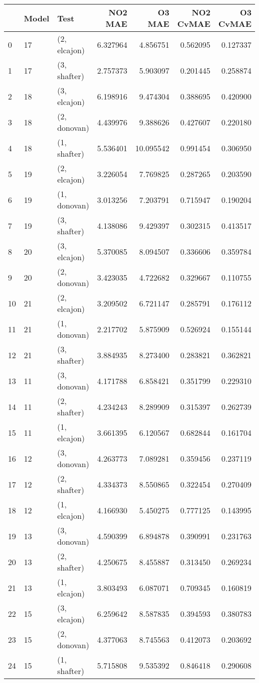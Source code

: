 \begin{tabular}{lllrrrr}
\toprule
{} & Model &          Test &   NO2 MAE &     O3 MAE &  NO2 CvMAE &  O3 CvMAE \\
\midrule
0  &    17 &  (2, elcajon) &  6.327964 &   4.856751 &   0.562095 &  0.127337 \\
1  &    17 &  (3, shafter) &  2.757373 &   5.903097 &   0.201445 &  0.258874 \\
2  &    18 &  (3, elcajon) &  6.198916 &   9.474304 &   0.388695 &  0.420900 \\
3  &    18 &  (2, donovan) &  4.439976 &   9.388626 &   0.427607 &  0.220180 \\
4  &    18 &  (1, shafter) &  5.536401 &  10.095542 &   0.991454 &  0.306950 \\
5  &    19 &  (2, elcajon) &  3.226054 &   7.769825 &   0.287265 &  0.203590 \\
6  &    19 &  (1, donovan) &  3.013256 &   7.203791 &   0.715947 &  0.190204 \\
7  &    19 &  (3, shafter) &  4.138086 &   9.429397 &   0.302315 &  0.413517 \\
8  &    20 &  (3, elcajon) &  5.370085 &   8.094507 &   0.336606 &  0.359784 \\
9  &    20 &  (2, donovan) &  3.423035 &   4.722682 &   0.329667 &  0.110755 \\
10 &    21 &  (2, elcajon) &  3.209502 &   6.721147 &   0.285791 &  0.176112 \\
11 &    21 &  (1, donovan) &  2.217702 &   5.875909 &   0.526924 &  0.155144 \\
12 &    21 &  (3, shafter) &  3.884935 &   8.273400 &   0.283821 &  0.362821 \\
13 &    11 &  (3, donovan) &  4.171788 &   6.858421 &   0.351799 &  0.229310 \\
14 &    11 &  (2, shafter) &  4.234243 &   8.289909 &   0.315397 &  0.262739 \\
15 &    11 &  (1, elcajon) &  3.661395 &   6.120567 &   0.682844 &  0.161704 \\
16 &    12 &  (3, donovan) &  4.263773 &   7.089281 &   0.359456 &  0.237119 \\
17 &    12 &  (2, shafter) &  4.334373 &   8.550865 &   0.322454 &  0.270409 \\
18 &    12 &  (1, elcajon) &  4.166930 &   5.450275 &   0.777125 &  0.143995 \\
19 &    13 &  (3, donovan) &  4.590399 &   6.894878 &   0.390991 &  0.231763 \\
20 &    13 &  (2, shafter) &  4.250675 &   8.455887 &   0.313450 &  0.269234 \\
21 &    13 &  (1, elcajon) &  3.803493 &   6.087071 &   0.709345 &  0.160819 \\
22 &    15 &  (3, elcajon) &  6.259642 &   8.587835 &   0.394593 &  0.380783 \\
23 &    15 &  (2, donovan) &  4.377063 &   8.745563 &   0.412073 &  0.203692 \\
24 &    15 &  (1, shafter) &  5.715808 &   9.535392 &   0.846418 &  0.290608 \\
\bottomrule
\end{tabular}
